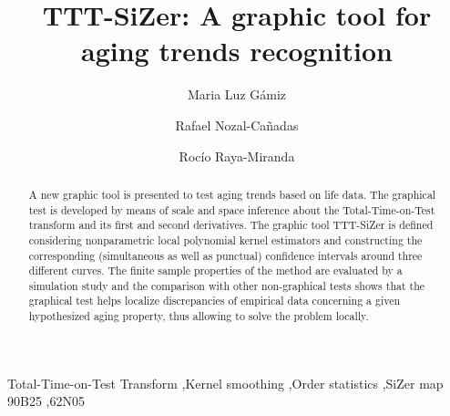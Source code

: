 \documentclass[preprint,12pt]{elsarticle}
\begin{document}
\begin{frontmatter}

\title{TTT-SiZer: A graphic tool for aging trends recognition }


%
%

\author[inst1]{Maria Luz G\'amiz}

\author[inst2]{Rafael Nozal-Ca\~nadas}

\author[inst1]{Roc\'io Raya-Miranda}



\address[inst1]{Department of Statistics and O.R., University of Granada,  Spain}
\address[inst2]{Department of Computer Science, UiT-The Arctic University of Norway , Norway}


%
%


\begin{abstract}
A new graphic tool is presented to test aging trends based on life data.  The graphical test is developed by means of scale and space inference about the Total-Time-on-Test transform and its first and second derivatives. The graphic tool TTT-SiZer is defined considering nonparametric local polynomial kernel estimators and constructing the corresponding (simultaneous as well as punctual) confidence intervals around three different curves. The finite sample properties of the method are evaluated by a simulation study and the comparison with other non-graphical tests shows that the graphical test helps localize discrepancies of empirical data concerning a given hypothesized aging property, thus allowing to solve the problem locally. 


\end{abstract}

\begin{keyword}
Total-Time-on-Test Transform \sep Kernel smoothing \sep Order statistics \sep SiZer map
\MSC[2010] 90B25 \sep  62N05
\end{keyword}

\end{frontmatter}
\end{document}
